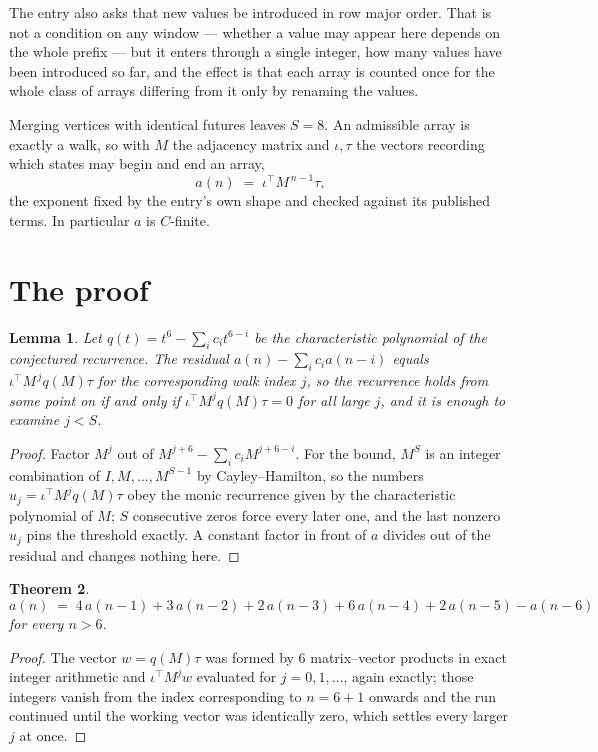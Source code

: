 \documentclass[11pt,a4paper]{article}
\theoremstyle{plain}
\newtheorem{theorem}{Theorem}
\newtheorem{lemma}[theorem]{Lemma}
\theoremstyle{definition}
\begin{document}
The entry also asks that new values be introduced in row major order. That is not a condition on any window --- whether a value may appear here depends on the whole prefix --- but it enters through a single integer, how many values have been introduced so far, and the effect is that each array is counted once for the whole class of arrays differing from it only by renaming the values.

Merging vertices with identical futures leaves $S=8$. An admissible array is exactly a walk, so with $M$ the adjacency matrix and $\iota,\tau$ the vectors recording which states may begin and end an array,
\[
a(n)\;=\;\iota^{\!\top}M^{\,n-1}\tau ,
\]
the exponent fixed by the entry's own shape and checked against its published terms. In
particular $a$ is $C$-finite.

\section{The proof}

\begin{lemma}\label{lem:crit}
Let $q(t)=t^{6}-\sum_i c_it^{6-i}$ be the characteristic polynomial of the
conjectured recurrence. The residual $a(n)-\sum_ic_ia(n-i)$ equals
$\iota^{\!\top}M^{\,j}q(M)\tau$ for the corresponding walk index $j$, so the recurrence
holds from some point on if and only if $\iota^{\!\top}M^{j}q(M)\tau=0$ for all large $j$,
and it is enough to examine $j<S$.
\end{lemma}

\begin{proof}
Factor $M^{j}$ out of $M^{j+6}-\sum_ic_iM^{j+6-i}$. For the bound, $M^{S}$
is an integer combination of $I,M,\dots,M^{S-1}$ by Cayley--Hamilton, so the numbers
$u_j=\iota^{\!\top}M^{j}q(M)\tau$ obey the monic recurrence given by the characteristic
polynomial of $M$; $S$ consecutive zeros force every later one, and the last nonzero $u_j$
pins the threshold exactly. A constant factor in front of $a$ divides out of the residual and
changes nothing here.
\end{proof}

\begin{theorem}
\[
a(n)\;=\;4\,a(n-1) + 3\,a(n-2) + 2\,a(n-3) + 6\,a(n-4) + 2\,a(n-5) - a(n-6)
\]
for every $n>6$.
\end{theorem}

\begin{proof}
The vector $w=q(M)\tau$ was formed by $6$ matrix--vector products in exact integer
arithmetic and $\iota^{\!\top}M^{j}w$ evaluated for $j=0,1,\dots$, again exactly; those
integers vanish from the index corresponding to $n=6+1$ onwards and the run continued
until the working vector was identically zero, which settles every larger $j$ at once.
\end{proof}
\end{document}
